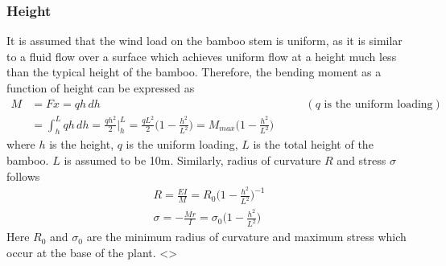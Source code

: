 \documentclass[10pt]{article}
\begin{document}
\subsubsection{Height}
It is assumed that the wind load on the bamboo stem is uniform, as it is similar to a fluid flow over a surface which achieves uniform flow at a height much less than the typical height of the bamboo. Therefore, the bending moment as a function of height can be expressed as
\begin{equation}
\begin{split}
M &= Fx = qh\,dh &\qquad (q \text{ is the uniform loading})\\
&= \int_{h}^Lqh\,dh = \frac{qh^2}{2}\bigg|^L_h = \frac{qL^2}{2}\bigg(1-\frac{h^2}{L^2}\bigg) = M_{max}\bigg(1-\frac{h^2}{L^2}\bigg)
\end{split}
\end{equation}
where $h$ is the height, $q$ is the uniform loading, $L$ is the total height of the bamboo. $L$ is assumed to be 10m.
Similarly, radius of curvature $R$ and stress $\sigma$ follows
\begin{eqnarray}
R = \frac{EI}{M} = R_0\bigg(1-\frac{h^2}{L^2}\bigg)^{-1}\\
\sigma = -\frac{Mr}{I} = \sigma_0\bigg(1-\frac{h^2}{L^2}\bigg)
\end{eqnarray}
Here $R_0$ and $\sigma_0$ are the minimum radius of curvature and maximum stress which occur at the base of the plant. 
<>
\end{document}

